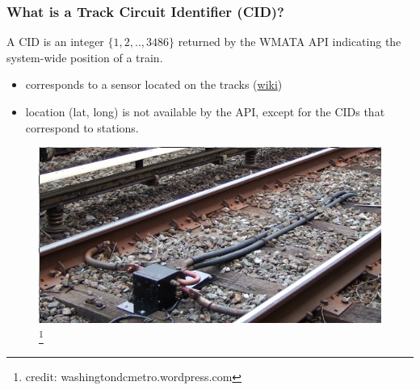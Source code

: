 \documentclass[t]{beamer}
\begin{document}
\begin{frame}
\end{frame}



\begin{frame}
\frametitle{What is a Track Circuit Identifier (CID)?}

A CID is an integer $\{1, 2, .., 3486\}$ returned by the WMATA API indicating the system-wide position of a train.
\begin{itemize}
\item corresponds to a sensor located on the tracks (\href{https://en.wikipedia.org/wiki/Track_circuit}{wiki})
\item location (lat, long) is not available by the API, except for the
  CIDs that correspond to stations.
\end{itemize}

\begin{center}
\begin{figure}
  \includegraphics[scale=0.4]{track_sensor.png}
  \footnote{credit: washingtondcmetro.wordpress.com}
\end{figure}
\end{center}
\end{frame}
\end{document}
